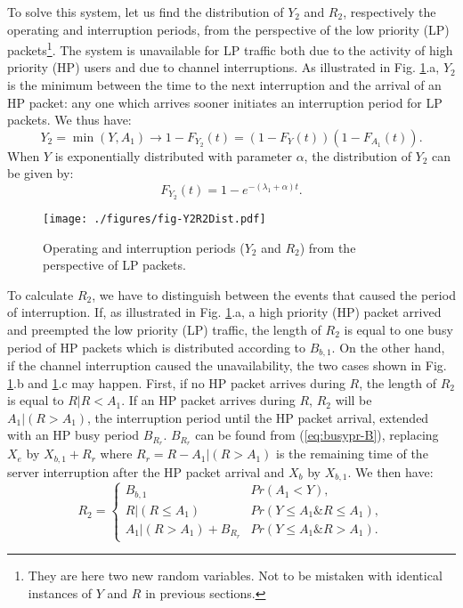 \documentclass[11pt,journal,oneside,onecolumn,draftclsnofoot]{IEEEtran}
\begin{document}
To solve this system, let us find the distribution of $Y_2$ and $R_2$, respectively the operating and interruption periods, from the perspective of the low priority (LP) packets\footnote{They are here two new random variables. Not to be mistaken with identical instances of $Y$ and $R$ in previous sections.}. The system is unavailable for LP traffic both due to the activity of high priority (HP) users and due to channel interruptions. As illustrated in Fig. \ref{fig-Y2R2Dist}.a, $Y_2$ is the minimum between the time to the next interruption and the arrival of an HP packet: any one which arrives sooner initiates an interruption period for LP packets. We thus have:
\begin{equation}
Y_2=\min (Y,A_1)  \rightarrow  1-F_{Y_2}(t) = (1-F_{Y}(t)) (1-F_{A_1}(t)).
\label{eq:Dist-Y2-base}
\end{equation}
When $Y$ is exponentially distributed with parameter $\alpha$, the distribution of $Y_2$ can be given by: 
\begin{equation}
F_{Y_2}(t) = 1- e^{-(\lambda_1+\alpha)t}.
\label{eq:Dist-Y2-base}
\end{equation}
\begin{figure}\texttt{[image: ./figures/fig-Y2R2Dist.pdf]}\caption{Operating and interruption periods ($Y_2$ and $R_2$) from the perspective of LP packets.}\label{fig-Y2R2Dist}\end{figure}
To calculate $R_2$, we have to distinguish between the events that caused the period of interruption.
If, as illustrated in Fig. \ref{fig-Y2R2Dist}.a, a high priority (HP) packet arrived and preempted the low priority (LP) traffic, the length of $R_2$ is equal to one busy period of HP packets which is distributed according to $B_{b,1}$. On the other hand, if the channel interruption caused the unavailability, the two cases  shown in Fig. \ref{fig-Y2R2Dist}.b and \ref{fig-Y2R2Dist}.c may happen. First, if no HP packet arrives during $R$, the length of $R_2$ is equal to $R|R<A_1$. If an HP packet arrives during $R$, $R_2$ will be $A_1|(R>A_1)$, the interruption period until the HP packet arrival, extended with an HP busy period $B_{R_r}$. $B_{R_r}$ can be found from (\ref{eq:busypr-B}), replacing $X_e$ by $X_{b,1}+R_r$ where $R_{r}=R-A_1|(R>A_1)$ is the remaining time of the server interruption after the HP packet arrival and $X_b$ by $X_{b,1}$. We then have:
\begin{equation}
R_2=\begin{cases}
B_{b,1} & Pr(A_1<Y),\\ 
R|(R \leq A_1)& Pr(Y \leq A_1 {\&} R \leq A_1),\\
A_1|(R>A_1)+B_{R_r}& Pr(Y \leq A_1 {\&} R>A_1).
\end{cases}
\label{eq:}
\end{equation}
\end{document}
